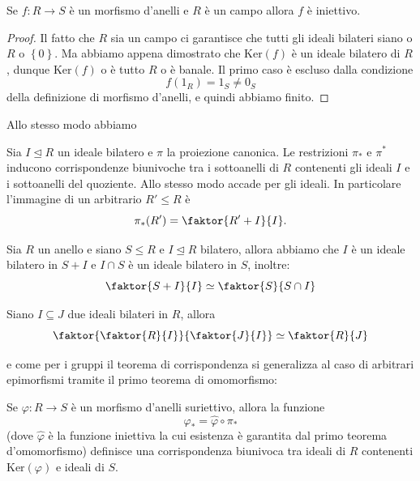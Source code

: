 \documentclass[11pt]{scrartcl}
\renewcommand{\ker}[1]{\text{Ker}\!\left(#1\right)}
\newcommand{\normal}{\mathrel{\unlhd}}
\begin{document}
	\begin{corollary}
		Se $f:R\to S$ è un morfismo d'anelli e $R$ è un campo allora $f$ è iniettivo.
	\end{corollary}
	\begin{proof}
		Il fatto che $R$ sia un campo ci garantisce che tutti gli ideali bilateri siano o $R$ o $\left\{0\right\}$. Ma abbiamo appena dimostrato che $\ker{f}$ è un ideale bilatero di $R$, dunque $\ker{f}$ o è tutto $R$ o è banale. Il primo caso è escluso dalla condizione $$f(1_R)=1_S\ne 0_S$$
		della definizione di morfismo d'anelli, e quindi abbiamo finito.
	\end{proof}
	Allo stesso modo abbiamo
	\begin{theorem}[di corrispondenza]
		Sia $I\normal R$ un ideale bilatero e $\pi$ la proiezione canonica. Le restrizioni $\pi_*$ e $\pi^*$ inducono corrispondenze biunivoche tra i sottoanelli di $R$ contenenti gli ideali $I$ e i sottoanelli del quoziente. Allo stesso modo accade per gli ideali. In particolare l'immagine di un arbitrario $R'\le R$ è
		$$\pi_*(R')=\faktor{R'+I}{I}.$$
	\end{theorem}
	\begin{theorem}
		Sia $R$ un anello e siano $S\le R$ e $I\normal R$ bilatero, allora abbiamo che $I$ è un ideale bilatero in $S+I$ e $I\cap S$ è un ideale bilatero in $S$, inoltre:
		$$\faktor{S+I}{I}\simeq \faktor{S}{S\cap I}$$ 
	\end{theorem}
	\begin{theorem}
		Siano $I\subseteq J$ due ideali bilateri in $R$, allora
		$$\faktor{\faktor{R}{I}}{\faktor{J}{I}}\simeq \faktor{R}{J}$$
	\end{theorem}
	e come per i gruppi il teorema di corrispondenza si generalizza al caso di arbitrari epimorfismi tramite il primo teorema di omomorfismo:
	\begin{theorem}
		Se $\varphi:R\to S$ è un morfismo d'anelli suriettivo, allora la funzione
		$$\varphi_*=\hat{\varphi}\circ \pi_*$$
		(dove $\hat{\varphi}$ è la funzione iniettiva la cui esistenza è garantita dal primo teorema d'omomorfismo) definisce una corrispondenza biunivoca tra ideali di $R$ contenenti $\ker{\varphi}$ e ideali di $S$.
	\end{theorem}
\end{document}
